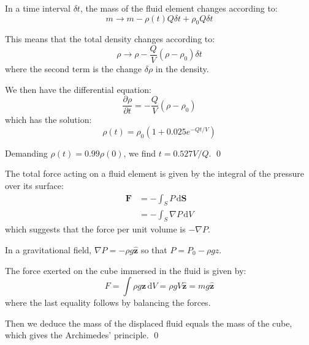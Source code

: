 \documentclass[12pt]{article}
\begin{document}
In a time interval $\delta t$, the mass of the fluid element changes according to:
\begin{equation}
    m \to m - \rho(t) Q \delta t + \rho_{0} Q \delta t
\end{equation}

This means that the total density changes according to:
\begin{equation}
    \rho \to \rho - \frac{Q}{V} (\rho - \rho_{0}) \delta t
\end{equation}
where the second term is the change $\delta \rho$ in the density.

We then have the differential equation:
\begin{equation}
    \frac{\partial \rho}{\partial t} = -\frac{Q}{V} (\rho - \rho_{0})
\end{equation}
which has the solution:
\begin{equation}
    \rho(t) = \rho_{0} \left( 1 + 0.025 e^{-Qt/V} \right)
\end{equation}

Demanding $\rho(t) = 0.99 \rho(0)$, we find $t = 0.527 V/Q$.
\qed



The total force acting on a fluid element is given by the integral of the pressure over its surface:
\begin{equation}
    \begin{split}
        \mathbf{F} &= -\int_{S} P \, \mathrm{d}\mathbf{S} \\
        &= -\int_{S} \nabla P \, \mathrm{d}V
    \end{split}
\end{equation}
which suggests that the force per unit volume is $-\nabla P$.

In a gravitational field, $\nabla P = -\rho g \hat{\mathbf{z}}$ so that $P = P_{0} - \rho g z$.

The force exerted on the cube immersed in the fluid is given by:
\begin{equation}
    F = \int \rho g \mathbf{z} \, \mathrm{d}V = \rho g V \hat{\mathbf{z}} = mg \hat{\mathbf{z}}
\end{equation}
where the last equality follows by balancing the forces.

Then we deduce the mass of the displaced fluid equals the mass of the cube, which gives the Archimedes' principle.
\qed
\end{document}
